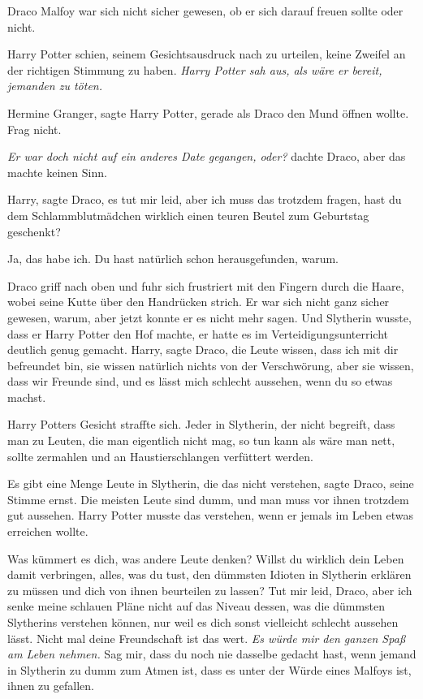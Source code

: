 Draco Malfoy war sich nicht sicher gewesen, ob er sich darauf freuen sollte oder
nicht.

Harry Potter schien, seinem Gesichtsausdruck nach zu urteilen, keine Zweifel an
der richtigen Stimmung zu haben. \emph{Harry Potter sah aus, als wäre er bereit,
jemanden zu töten.}

\glqq{}Hermine Granger\grqq{}, sagte Harry Potter, gerade als Draco den Mund
öffnen wollte. \glqq{}Frag nicht.\grqq{}

\emph{Er war doch nicht auf ein anderes Date gegangen, oder?} dachte Draco, aber
das machte keinen Sinn.

\glqq{}Harry\grqq{}, sagte Draco, \glqq{}es tut mir leid, aber ich muss das
trotzdem fragen, hast du dem Schlammblutmädchen wirklich einen teuren Beutel zum
Geburtstag geschenkt?\grqq{}

\glqq{}Ja, das habe ich. Du hast natürlich schon herausgefunden, warum.\grqq{}

Draco griff nach oben und fuhr sich frustriert mit den Fingern durch die Haare,
wobei seine Kutte über den Handrücken strich. Er war sich nicht ganz sicher
gewesen, warum, aber jetzt konnte er es nicht mehr sagen. Und Slytherin wusste,
dass er Harry Potter den Hof machte, er hatte es im Verteidigungsunterricht
deutlich genug gemacht. \glqq{}Harry\grqq{}, sagte Draco, \glqq{}die Leute wissen,
dass ich mit dir befreundet bin, sie wissen natürlich nichts von der
Verschwörung, aber sie wissen, dass wir Freunde sind, und es lässt mich schlecht
aussehen, wenn du so etwas machst.\grqq{}

Harry Potters Gesicht straffte sich. \glqq{}Jeder in Slytherin, der nicht
begreift, dass man zu Leuten, die man eigentlich nicht mag, so tun kann als wäre
man nett, sollte zermahlen und an Haustierschlangen verfüttert werden.\grqq{}

\glqq{}Es gibt eine Menge Leute in Slytherin, die das nicht verstehen\grqq{},
sagte Draco, seine Stimme ernst. \glqq{}Die meisten Leute sind dumm, und man muss
vor ihnen trotzdem gut aussehen.\grqq{} Harry Potter musste das verstehen, wenn
er jemals im Leben etwas erreichen wollte.

\glqq{}Was kümmert es dich, was andere Leute denken? Willst du wirklich dein
Leben damit verbringen, alles, was du tust, den dümmsten Idioten in Slytherin
erklären zu müssen und dich von ihnen beurteilen zu lassen? Tut mir leid, Draco,
aber ich senke meine schlauen Pläne nicht auf das Niveau dessen, was die
dümmsten Slytherins verstehen können, nur weil es dich sonst vielleicht schlecht
aussehen lässt. Nicht mal deine Freundschaft ist das wert. \emph{Es würde mir
den ganzen Spaß am Leben nehmen.} Sag mir, dass du noch nie dasselbe gedacht
hast, wenn jemand in Slytherin zu dumm zum Atmen ist, dass es unter der Würde
eines Malfoys ist, ihnen zu gefallen.\grqq{}

